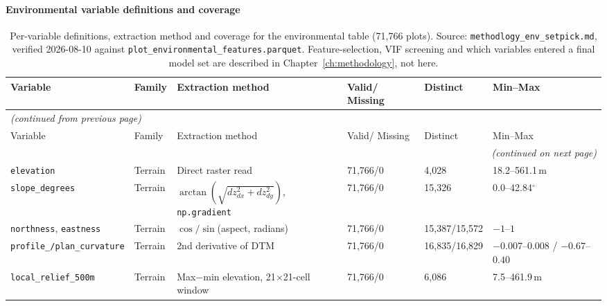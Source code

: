 \paragraph*{Environmental variable definitions and coverage}
{\tiny
\setlength{\tabcolsep}{2pt}
\renewcommand{\arraystretch}{0.9}
\begin{longtable}{p{2.3cm}p{1.6cm}p{3.0cm}p{1.3cm}p{1.1cm}p{2.3cm}}
\caption{Per-variable definitions, extraction method and coverage for the environmental table
(71,766 plots). Source: \texttt{methodlogy\_env\_setpick.md}, verified 2026-08-10 against
\texttt{plot\_environmental\_features.parquet}. Feature-selection, VIF screening and which
variables entered a final model set are described in Chapter~\ref{ch:methodology}, not here.}
\label{tab:data-env-variables_detail_app} \\
\hline
Variable & Family & Extraction method & Valid/ Missing & Distinct & Min--Max \\
\hline
\endfirsthead
\multicolumn{6}{l}{\normalfont\itshape (continued from previous page)} \\
\hline
Variable & Family & Extraction method & Valid/ Missing & Distinct & Min--Max \\
\hline
\endhead
\hline
\multicolumn{6}{r}{\normalfont\itshape (continued on next page)} \\
\endfoot
\hline
\endlastfoot
\texttt{elevation} & Terrain & Direct raster read & 71{,}766/0 & 4{,}028 & 18.2--561.1\,m \\
\texttt{slope\_degrees} & Terrain & $\arctan(\sqrt{dz_{dx}^2+dz_{dy}^2})$, \texttt{np.gradient} & 71{,}766/0 & 15{,}326 & 0.0--42.84$^\circ$ \\
\texttt{northness}, \texttt{eastness} & Terrain & $\cos/\sin$(aspect, radians) & 71{,}766/0 & 15{,}387/15{,}572 & $-1$--$1$ \\
\texttt{profile\_/plan\_curvature} & Terrain & 2nd derivative of DTM \citep{zevenbergen1987} & 71{,}766/0 & 16{,}835/16{,}829 & $-0.007$--$0.008$ / $-0.67$--$0.40$ \\
\texttt{local\_relief\_500m} & Terrain & Max$-$min elevation, 21$\times$21-cell window & 71{,}766/0 & 6{,}086 & 7.5--461.9\,m \\

\end{longtable}}
